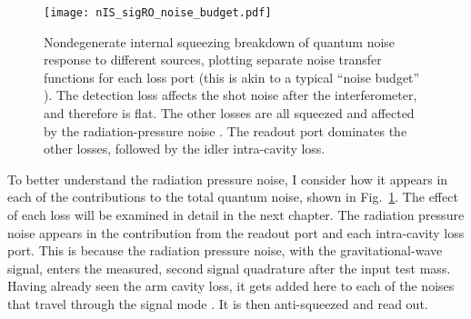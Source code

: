 \begin{figure}
	\centering
	\texttt{[image: nIS\_sigRO\_noise\_budget.pdf]}
	\caption{  Nondegenerate internal squeezing breakdown of quantum noise response to different sources, plotting separate noise transfer functions for each loss port (this is akin to a typical ``noise budget''~\cite{} ). The detection loss affects the shot noise after the interferometer, and therefore is flat. The other losses are all squeezed and affected by the radiation-pressure noise . The readout port dominates the other losses, followed by the idler intra-cavity loss.}
	\label{fig:nIS_sigRO_noise_budget}
\end{figure}


To better understand the radiation pressure noise, I consider how it appears in each of the contributions to the total quantum noise, shown in Fig.~\ref{fig:nIS_sigRO_noise_budget}. The effect of each loss will be examined in detail in the next chapter. The radiation pressure noise appears in the contribution from the readout port and each intra-cavity loss port. This is because the radiation pressure noise, with the gravitational-wave signal, enters the measured, second signal quadrature after the input test mass. Having already seen the arm cavity loss, it gets added here to each of the noises that travel through the signal mode . It is then anti-squeezed  and read out. 

